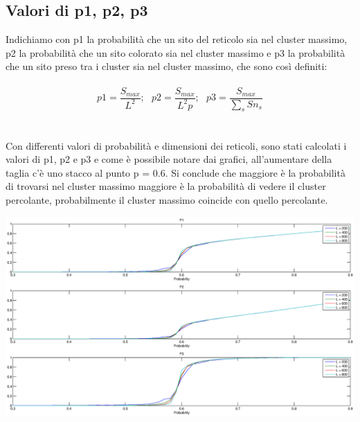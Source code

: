 \documentclass[10pt,a4paper]{article}
\begin{document}
\subsection{Valori di p1, p2, p3}
Indichiamo con p1 la probabilità che un sito del reticolo sia nel cluster massimo, p2 la probabilità che  un sito colorato sia nel cluster massimo e p3 la probabilità che un sito preso tra i cluster sia nel cluster massimo, che sono così definiti:\\\\
\[ p1 = \frac{S_{max}}{L^2};  \ \ \ p2 = \frac{S_{max}}{L^2p};  \ \ \ p3 = \frac{S_{max}}{\sum_{s}Sn_{s}} \]\\\\
Con differenti valori di probabilità e dimensioni dei reticoli, sono stati calcolati i valori di p1, p2 e p3 e come è possibile notare dai grafici, all’aumentare della taglia c’è uno stacco al punto p = 0.6. Si conclude che maggiore è la probabilità di  trovarsi nel cluster massimo maggiore è la  probabilità di vedere il cluster percolante, probabilmente il cluster massimo coincide con quello percolante.

\centerline{\includegraphics[scale=0.5]{p123.eps}}
\end{document}
